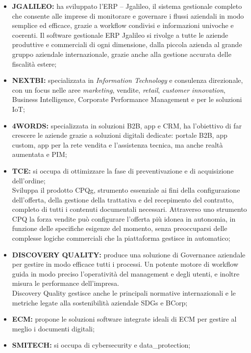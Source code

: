 \begin{itemize}
  \item \textbf{JGALILEO:} ha sviluppato l’\gls{ERP} –  Jgalileo, il sistema gestionale completo che consente alle imprese di monitorare e governare i flussi aziendali in modo semplice ed efficace, grazie a workflow condivisi e informazioni univoche e coerenti. Il software gestionale ERP Jgalileo si rivolge a tutte le aziende produttive e commerciali di ogni dimensione, dalla piccola azienda al grande gruppo aziendale internazionale, grazie anche alla gestione accurata delle fiscalità estere;
  \item \textbf{NEXTBI:} specializzata in \textit{Information Technology} e consulenza direzionale, con un focus nelle aree \textit{marketing}, vendite, \textit{retail}, \textit{customer innovation}, Business Intelligence, Corporate Performance Management e per le soluzioni \gls{IoT};
  \item \textbf{4WORDS:} specializzata in soluzioni \gls{B2B}, app e \gls{CRM}, ha l’obiettivo di far crescere le aziende grazie a soluzioni digitali dedicate: portale B2B, \gls{app} custom, app per la rete vendita e l’assistenza tecnica, ma anche realtà aumentata e \gls{PIM};
  \item \textbf{TCE:} si occupa di ottimizzare la fase di preventivazione e di acquisizione dell’ordine; \\
  Sviluppa il prodotto \gls{CPQg}, strumento essenziale ai fini della configurazione dell’offerta, 
  della gestione della trattativa e del recepimento del contratto, completo di tutti i contenuti documentali necessari.
  Attraverso uno strumento CPQ la forza vendite può configurare l’offerta più idonea in autonomia, in funzione delle specifiche esigenze del momento, senza preoccuparsi delle complesse logiche commerciali che la piattaforma gestisce in automatico;
  \item \textbf{DISCOVERY QUALITY:} produce una soluzione di Governance aziendale per gestire in modo efficace tutti i processi. 
  Un potente motore di workflow guida in modo preciso l’operatività del management e degli utenti, e inoltre misura le performance dell’impresa. \\
  Discovery Quality gestisce anche le principali normative internazionali e le metriche legate alla sostenibilità aziendale \gls{SDGs} e \gls{BCorp};
  \item \textbf{ECM:} propone le soluzioni software integrate ideali di \gls{ECM} per gestire al meglio i documenti digitali;
  \item \textbf{SMITECH:} si occupa di \gls{cybersecurity} e \gls{data_protection};

\end{itemize}
